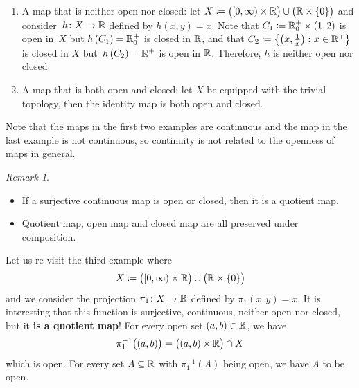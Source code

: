 \documentclass[math]{amznotes}
\theoremstyle{remark}
\newtheorem*{remark}{Remark}
\begin{document}
\begin{enumerate}
    \begin{equation*}
        g\bigl(\left(0, 1\right)\bigr) = \left(0, 1\right) \subseteq \left(0, 2\right)
    \end{equation*}
    is open in $\left(0, 2\right)$. Therefore, $g$ is not closed.
    \item A map that is neither open nor closed: let $X \coloneqq \bigl(\left[0, \infty\right) \times \mathbb{R}\bigr) \cup \bigl(\mathbb{R} \times \left\{0\right\}\bigr)$ and consider~$h \colon X \to \mathbb{R}$ defined by $h\left(x, y\right) = x$. Note that $C_1 \coloneqq \mathbb{R}^+_0 \times \left(1, 2\right)$ is open in~$X$ but $h\left(C_1\right) = \mathbb{R}^+_0$ is closed in $\mathbb{R}$, and that $C_2 \coloneqq \left\{\left(x, \frac{1}{x}\right) \colon x \in \mathbb{R}^+\right\}$ is closed in $X$ but~$h\left(C_2\right) = \mathbb{R}^+$ is open in $\mathbb{R}$. Therefore, $h$ is neither open nor closed.
    \item A map that is both open and closed: let $X$ be equipped with the trivial topology, then the identity map is both open and closed.
\end{enumerate}
Note that the maps in the first two examples are continuous and the map in the last example is not continuous, so continuity is not related to the openness of maps in general. 
\begin{notebox}
    \begin{remark}
        \quad
        \begin{itemize}
            \item If a surjective continuous map is open or closed, then it is a quotient map.   
            \item Quotient map, open map and closed map are all preserved under composition.
        \end{itemize} 
    \end{remark}
\end{notebox}
Let us re-visit the third example where 
\begin{equation*}
    X \coloneqq \bigl(\left[0, \infty\right) \times \mathbb{R}\bigr) \cup \bigl(\mathbb{R} \times \left\{0\right\}\bigr) 
\end{equation*}
and we consider the projection $\pi_1 \colon X \to \mathbb{R}$ defined by $\pi_1\left(x, y\right) = x$. It is interesting that this function is surjective, continuous, neither open nor closed, but it \textbf{is a quotient map}! For every open set $\left(a, b\right) \in \mathbb{R}$, we have 
\begin{equation*}
    \pi_1^{-1}\bigl(\left(a, b\right)\bigr) = \bigl(\left(a, b\right) \times \mathbb{R}\bigr) \cap X
\end{equation*}
which is open. For every set $A \subseteq \mathbb{R}$ with $\pi_1^{-1}\left(A\right)$ being open, we have $A$ to be open.
\end{document}
